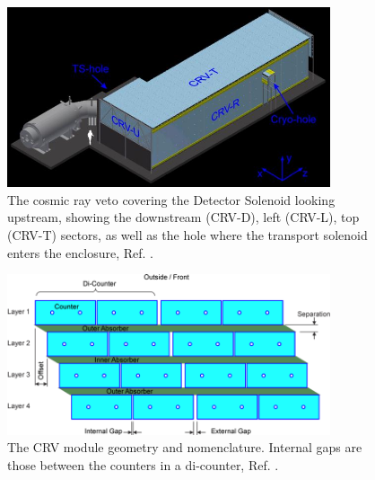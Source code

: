 \begin{figure}[!h]
\centering
\includegraphics[width =0.85\textwidth]{figures/jpg/Crv_downstream.jpg}
\caption{The cosmic ray veto covering the Detector Solenoid looking upstream, showing the downstream (CRV-D), left (CRV-L), top (CRV-T) sectors, as well as the hole where the transport solenoid enters the enclosure, Ref. \cite{bartoszek2015mu2e}.}
\label{fig:crv}
\end{figure}

\begin{figure}[!h]
\centering
\includegraphics[width =0.85\textwidth]{figures/png/Crv_module_geometry.png}
\caption{The CRV module geometry and nomenclature. Internal gaps are those between the counters in a di-counter, Ref. \cite{Giovannella_2020}.}
\label{fig:crvmodule}
\end{figure}
